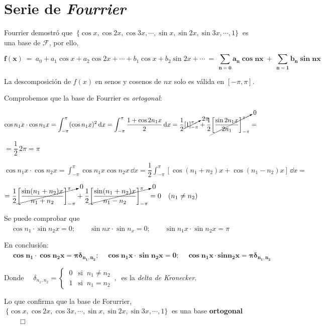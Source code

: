 \section{Serie de \emph{Fourrier}}

Fourrier demostró que $\ \{\cos x, \cos 2x, \cos 3x , \cdots , \sin x, \sin 2x, \sin 3x, \cdots , 1 \} \ $ es una base de $\mathcal F$, por ello, 

$$\boldsymbol{ f(x)} \ = \ a_0+a_1\cos x+a_2\cos 2x + \cdots +b_1\cos x + b_2 \sin 2x + \cdots \ = \  \displaystyle \boldsymbol{ \sum_{n=0} a_n \cos nx \ + \  \sum_{n=1} b_n \sin nx}$$

La descomposición de $f(x)$ en senos y cosenos de $nx$ solo es válida en $[-\pi,\pi]$.

Comprobemos que la base de Fourrier es \emph{ortogonal}:


$\cos n_1 x \cdot \cos n_1 x = \displaystyle \int_{-\pi}^{\pi} (\cos n_1x)^2\, \dd x = \int_{-\pi}^{\pi} \dfrac{1+\cos 2n_1x}{2}\, \dd x = \dfrac 1 2  \cancelto{2\pi}{\left[1\right]_{-\pi}^{\pi}} + \dfrac 1 2 \cancelto{0}{\left[ \dfrac {\sin 2n_1x}{2n_1} \right]_{-\pi}^\pi }=$

$=\dfrac 1 2 \, 2\pi = \pi$

$\displaystyle \cos n_1x \cdot \cos n_2 x = \int_{-\pi}^\pi \cos n_1 x \cos n_2 x \, \dd x = \dfrac 1 2 \int_{-\pi}^\pi [\cos(n_1+n_2)x+\cos(n_1-n_2)x] \, \dd x = $

$\displaystyle = \dfrac 1 2\cancelto{0}{\left[ \dfrac{\sin (n_1+n_2)x}{n_1+n_2} \right]_{-\pi}^\pi} +  \dfrac 1 2\cancelto{0}{\left[ \dfrac{\sin (n_1+n_2)x}{n_1-n_2} \right]_{-\pi}^\pi} =0 \quad (n_1 \neq n_2)$

Se puede comprobar que $ \quad \cos n_1\cdot \sin n_2 x = 0;\qquad \sin nx\cdot \sin n_x= 0;\qquad \sin n_1 x \cdot \sin n_2 x = \pi$

En conclusión: $\quad \boldsymbol{ \cos n_1\cdot \cos n_2 x = \pi \delta_{n_1,n_2};\quad \cos n_1 x \cdot \sin n_2 x = 0 ;\quad \cos n_1x \cdot sin n_2 x = \pi \delta_{n_1,n_2} }$

Donde $\quad \delta_{n_1,n_2}= \begin{cases} \ 0 & \text{si } \  n_1 \neq n_2 \\ \ 1 & \text{si } \ n_1=n_2 \end{cases}\, , \ $ es la \emph{delta de Kronecker}.

Lo que confirma que la base de Forurrier, $\ \{\cos x, \cos 2x, \cos 3x , \cdots , \sin x, \sin 2x, \sin 3x, \cdots , 1 \} \ $ es una base \textbf{ortogonal} $\qquad\Box$



